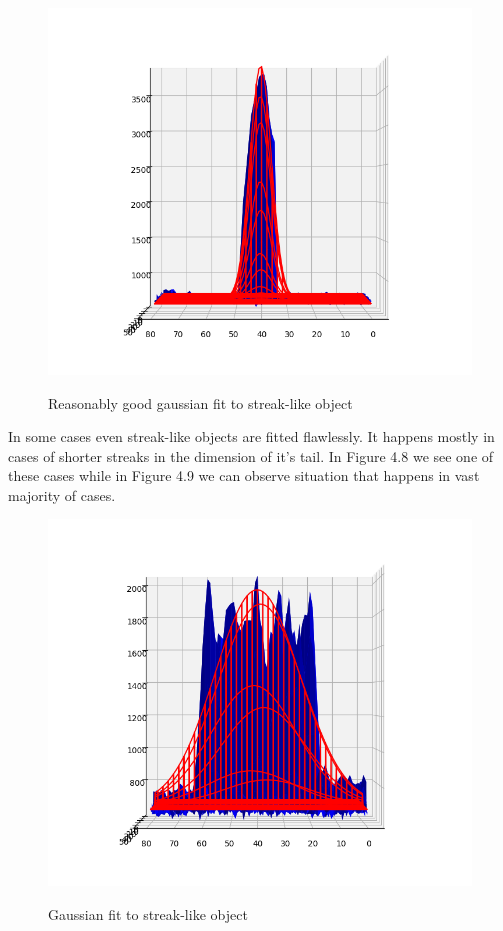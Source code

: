 \documentclass[12pt, a4paper, oneside]{book}
\begin{document}
\begin{figure}[H]
    \begin{center}
        \includegraphics[scale=2.00]{images/gauss_streak.png}
        \label{img:gauss_point_bad}
        \caption{Reasonably good gaussian fit to streak-like object}
    \end{center}
\end{figure}

In some cases even streak-like objects are fitted flawlessly.
It happens mostly in cases of shorter streaks in the dimension of it's tail.
In Figure 4.8 we see one of these cases while in Figure 4.9 we can observe situation that happens in vast majority of cases.

\begin{figure}[H]
    \begin{center}
        \includegraphics[scale=2.00]{images/gauss_streak_bad.png}
        \label{img:gauss_point_bad}
        \caption{Gaussian fit to streak-like object}
    \end{center}
\end{figure}
\end{document}
